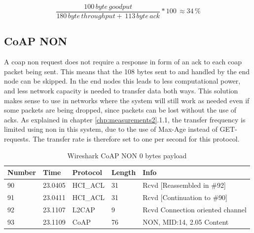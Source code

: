\begin{equation} \label{percentage}
    \frac{100 \, byte \, goodput}{180 \, byte \, throughput + \, 113 \, byte \, ack}*100 \, \approx 34 \,\%
\end{equation}



\subsection{CoAP NON}

\noindent A \gls{coap} \gls{non} request does not require a response in form of an \gls{ack} to each \gls{coap} packet being sent. This means that the 108 bytes sent to and handled by the end node can be skipped. In the end nodes this leads to less computational power, and less network capacity is needed to transfer data both ways. This solution makes sense to use in networks where the system will still work as needed even if some packets are being dropped, since packets can be lost without the use of \glspl{ack}. As explained in chapter \ref{chp:measurements2}.1.1, the transfer frequency is limited using \gls{non} in this system, due to the use of Max-Age instead of GET-requests. The transfer rate is therefore set to one per second for this protocol. 

\begin{table}[ht]
\small
\centering
\caption{Wireshark CoAP NON 0 bytes payload}
\label{coapNON0table}
\begin{tabular}{lllll}
\hline
Number & Time    & Protocol & Length & Info                             \\ \hline
90     & 23.0405 & HCI\_ACL & 31     & Rcvd {[}Reassembled in \#92{]}   \\
91     & 23.0411 & HCI\_ACL & 31     & Rcvd {[}Continuation to \#90{]}  \\
92     & 23.1107 & L2CAP    & 9      & Rcvd Connection oriented channel \\
93     & 23.1109 & CoAP     & 76     & NON, MID:14, 2.05 Content        \\ \hline
\end{tabular}
\end{table}


